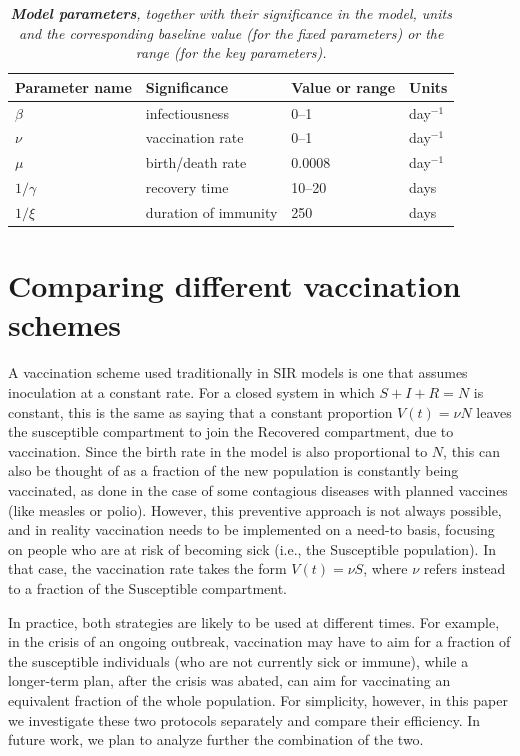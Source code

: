 \documentclass[10pt]{article}
\begin{document}
\begin{table}[h!]
\begin{center}
\begin{tabular}{|l|l|l|l|}
\hline
{\bf Parameter name} & {\bf Significance} & {\bf Value or range} & {\bf Units}\\
\hline
$\beta$ & infectiousness & 0--1 & day$^{-1}$\\
\hline
$\nu$ & vaccination rate & 0--1 & day$^{-1}$\\
\hline
$\mu$ & birth/death rate & 0.0008 & day$^{-1}$\\
\hline
$1/\gamma$ & recovery time &  10--20 & days\\
\hline
$1/\xi$ & duration of immunity & 250 & days\\
\hline
\end{tabular}
\end{center}
\caption{\emph{{\bf Model parameters}, together with their significance in the model, units and the corresponding baseline value (for the fixed parameters) or the range (for the key parameters).}}
\label{parameter_values}
\end{table}


\section{Comparing different vaccination schemes}

A vaccination scheme used traditionally in SIR models is one that assumes inoculation at a constant rate. For a closed system in which $S+I+R = N$ is constant, this is the same as saying that a constant proportion $V(t) = \nu N$ leaves the susceptible compartment to join the Recovered compartment, due to vaccination. Since the birth rate in the model is also proportional to $N$, this can also be thought of as a fraction of the new population is constantly being vaccinated, as done in the case of some contagious diseases with planned vaccines (like measles or polio). However, this preventive approach is not always possible, and in reality vaccination needs to be implemented on a need-to basis, focusing on people who are at risk of becoming sick (i.e., the Susceptible population). In that case, the vaccination rate takes the form $V(t) = \nu S$, where $\nu$ refers instead to a fraction of the Susceptible compartment. 

In practice, both strategies are likely to be used at different times. For example, in the crisis of an ongoing outbreak, vaccination may have to aim for a fraction of the susceptible individuals (who are not currently sick or immune), while a longer-term plan, after the crisis was abated, can aim for vaccinating an equivalent fraction of the whole population. For simplicity, however, in this paper we investigate these two protocols separately and compare their efficiency. In future work, we plan to analyze further the combination of the two.
\end{document}
